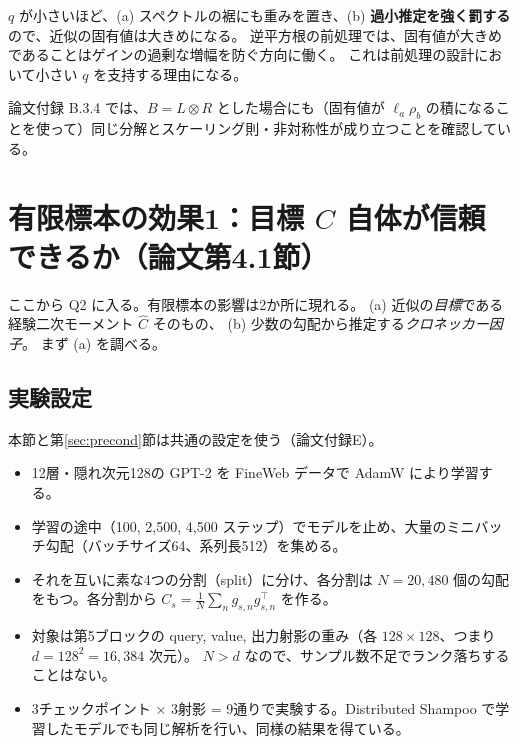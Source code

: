 \documentclass[a4paper,11pt]{ltjsarticle}
\theoremstyle{definition}
\theoremstyle{plain}
\newcommand{\T}{^{\top}}
\begin{document}
\begin{pointbox}
$q$ が小さいほど、(a) スペクトルの裾にも重みを置き、(b) \textbf{過小推定を強く罰する}ので、近似の固有値は大きめになる。
逆平方根の前処理では、固有値が大きめであることはゲインの過剰な増幅を防ぐ方向に働く。
これは前処理の設計において小さい $q$ を支持する理由になる。
\end{pointbox}

論文付録 B.3.4 では、$B = L\otimes R$ とした場合にも（固有値が $\ell_a\rho_b$ の積になることを使って）同じ分解とスケーリング則・非対称性が成り立つことを確認している。

\section{有限標本の効果1：目標 $C$ 自体が信頼できるか（論文第4.1節）}\label{sec:reliability}

ここから Q2 に入る。有限標本の影響は2か所に現れる。
(a) 近似の\emph{目標}である経験二次モーメント $\widehat C$ そのもの、
(b) 少数の勾配から推定する\emph{クロネッカー因子}。
まず (a) を調べる。

\subsection{実験設定}

本節と第\ref{sec:precond}節は共通の設定を使う（論文付録E）。
\begin{itemize}
  \item 12層・隠れ次元128の GPT-2 を FineWeb データで AdamW により学習する。
  \item 学習の途中（100, 2{,}500, 4{,}500 ステップ）でモデルを止め、大量のミニバッチ勾配（バッチサイズ64、系列長512）を集める。
  \item それを互いに素な4つの分割（split）に分け、各分割は $N = 20{,}480$ 個の勾配をもつ。各分割から $C_s = \frac1N\sum_n g_{s,n}g_{s,n}\T$ を作る。
  \item 対象は第5ブロックの query, value, 出力射影の重み（各 $128\times128$、つまり $d = 128^2 = 16{,}384$ 次元）。
        $N > d$ なので、サンプル数不足でランク落ちすることはない。
  \item 3チェックポイント × 3射影 = 9通りで実験する。Distributed Shampoo で学習したモデルでも同じ解析を行い、同様の結果を得ている。
\end{itemize}
\end{document}
